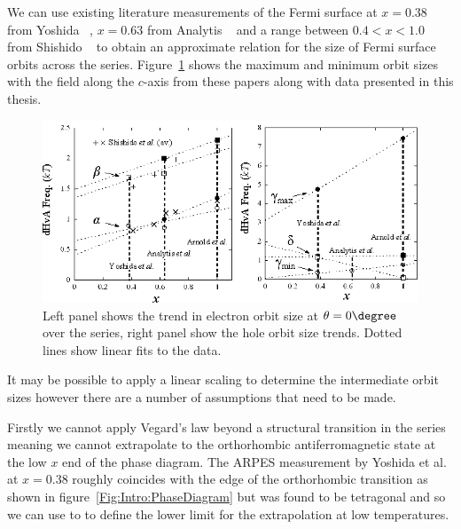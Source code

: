 We can use existing literature measurements of the Fermi surface at $x=0.38$ from Yoshida \etal~\cite{Yoshida2010}, $x=0.63$ from Analytis \etal~\cite{Analytis2010c} and a range between $0.4 < x < 1.0$ from Shishido \etal~\cite{Shishido2010} to obtain an approximate relation for the size of Fermi surface orbits across the \BaFePAs series. Figure~\ref{Fig:ResD:SeriesRecipe} shows the maximum and minimum orbit sizes with the field along the $c$-axis from these papers along with data presented in this thesis.
\begin{figure}[htbp]
    \begin{center}
        \includegraphics[scale=1.3]{Chapter-dHvABaFe2P2/Figures/AngleDepMeasurements/SeriesRecipe/SeriesRecipe}
        \caption{Left panel shows the trend in electron orbit size at $\theta=0\degree$ over the series, right panel show the hole orbit size trends. Dotted lines show linear fits to the data.}
        \label{Fig:ResD:SeriesRecipe}
    \end{center}
\end{figure}
It may be possible to apply a linear scaling to determine the intermediate orbit sizes however there are a number of assumptions that need to be made. 

Firstly we cannot apply Vegard's law beyond a structural transition in the series meaning we cannot extrapolate to the orthorhombic antiferromagnetic state at the low $x$ end of the phase diagram. The \ac{ARPES} measurement by Yoshida et al. at $x=0.38$ roughly coincides with the edge of the orthorhombic transition as shown in figure~\ref{Fig:Intro:PhaseDiagram} but was found to be tetragonal and so we can use to to define the lower limit for the extrapolation at low temperatures. 


